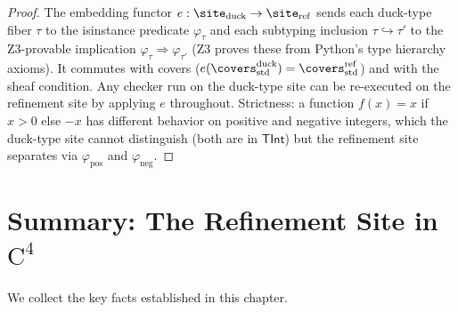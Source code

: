 \begin{proof}
The embedding functor $e : \site_{\mathrm{duck}} \to \site_{\mathrm{ref}}$
sends each duck-type fiber $\tau$ to the isinstance predicate $\varphi_\tau$
and each subtyping inclusion $\tau \hookrightarrow \tau'$ to the Z3-provable
implication $\varphi_\tau \Rightarrow \varphi_{\tau'}$ (Z3 proves these
from Python's type hierarchy axioms).  It commutes with covers
($e(\covers_{\mathrm{std}}^{\mathrm{duck}}) =
\covers_{\mathrm{std}}^{\mathrm{ref}}$) and with the sheaf condition.
Any checker run on the duck-type site can be re-executed on the
refinement site by applying $e$ throughout.  Strictness: a function
$f(x) = x$ if $x > 0$ else $-x$ has different behavior on positive
and negative integers, which the duck-type site cannot distinguish (both
are in $\mathsf{TInt}$) but the refinement site separates via
$\varphi_{\mathrm{pos}}$ and $\varphi_{\mathrm{neg}}$.
\end{proof}


\section{Summary: The Refinement Site in $\mathrm{C}^4$}
\label{sec:descent-summary}

We collect the key facts established in this chapter.

